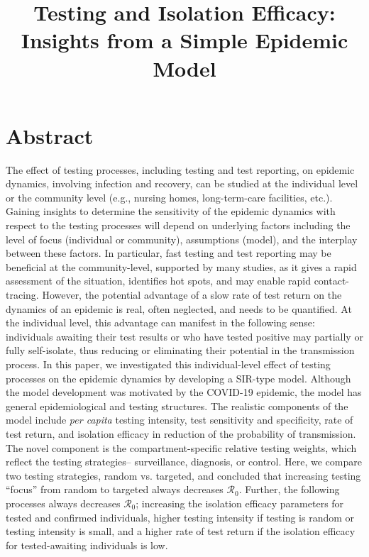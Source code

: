 \documentclass[12pt]{article}
\title{Testing and Isolation Efficacy: Insights from a Simple Epidemic Model}
\newcommand{\percap}{\emph{per capita}\xspace}
\newcommand{\Rnum}{\ensuremath{\mathcal{R}_0}}
\newcommand{\covid}{COVID-19\xspace}
\DeclareRobustCommand\_{\ifmmode\expandafter\subtxt\else\textunderscore\fi}
\theoremstyle{definition} %
\begin{document}
\maketitle

\linenumbers

\section{Abstract}

The effect of testing processes, including testing and test reporting, on epidemic dynamics, involving infection and recovery, can be studied at the individual level or the community level (e.g., nursing homes, long-term-care facilities, etc.).
Gaining insights to determine the sensitivity of the epidemic dynamics with respect to the testing processes will depend on underlying factors including the level of focus (individual or community), assumptions (model), and the interplay between these factors. 
In particular, fast testing and test reporting may be beneficial at the community-level, supported by many studies, as it gives a rapid assessment of the situation, identifies hot spots, and may enable rapid contact-tracing. However, the potential advantage of a slow rate of test return on the dynamics of an epidemic is real, often neglected, and needs to be quantified. At the individual level, this advantage can manifest in the following sense: individuals awaiting their test results or who have tested positive may partially or fully self-isolate, thus reducing or eliminating their potential in the transmission process.
In this paper, we investigated this individual-level effect of testing processes on the epidemic dynamics by developing a SIR-type model.
Although the model development was motivated by the \covid epidemic, the model has general epidemiological and testing structures. The realistic components of the model include \percap testing intensity, test sensitivity and specificity, rate of test return, and isolation efficacy in reduction of the probability of transmission. The novel component is the compartment-specific relative testing weights, which reflect the testing strategies-- surveillance, diagnosis, or control. Here, we compare two testing strategies, random vs. targeted, and concluded that increasing testing “focus” from random to targeted always decreases \Rnum. Further, the following processes always decreases $\Rnum$; increasing the isolation efficacy parameters for tested and confirmed individuals, higher testing intensity if testing is random or testing intensity is small, and a higher rate of test return if the isolation efficacy for tested-awaiting individuals is low.
\end{document}
